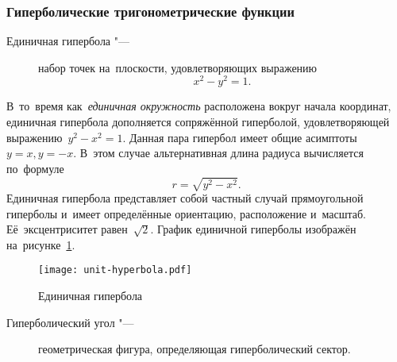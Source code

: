\documentclass[]{scrartcl}
\begin{document}
\subsubsection{Гиперболические тригонометрические функции}
\begin{description}
	\item[Единичная гипербола "---] набор точек на~плоскости, удовлетворяющих выражению
		\begin{equation}\label{eq:unit-hyperbola}
			x^{2} - y^{2} = 1.
		\end{equation}
\end{description}
В~то~время как~\emph{единичная окружность} расположена вокруг начала координат, единичная гипербола дополняется сопряжённой гиперболой, удовлетворяющей выражению~${\textstyle y^{2} - x^{2} = 1}$. Данная пара гипербол имеет общие асимптоты ${\textstyle y=x, y=-x}$. В~этом случае альтернативная длина радиуса вычисляется по~формуле
\begin{equation}\label{eq:unit-hyperbola-alternative-radius}
r = \sqrt{y^{2} - x^{2}}.
\end{equation}
Единичная гипербола представляет собой частный случай прямоугольной гиперболы и~имеет определённые ориентацию, расположение и~масштаб. Её~эксцентриситет равен~${\textstyle \sqrt{2}}$. График единичной гиперболы изображён на~рисунке~\ref{fig:unit-hyperbola}.
%
\begin{figure}[ht]
	\centering %
	\texttt{[image: unit-hyperbola.pdf]}
	\caption{Единичная гипербола}\label{fig:unit-hyperbola}
\end{figure}
%
\begin{description}
	\item[Гиперболический угол "---] геометрическая фигура, определяющая гиперболический сектор.
\end{description}
\end{document}
